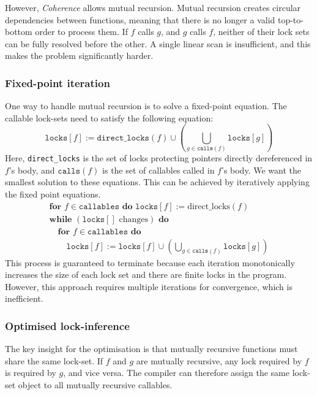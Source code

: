 However, \textit{Coherence} allows mutual recursion. Mutual recursion creates circular dependencies between functions, meaning that there is no longer a valid top-to-bottom order to process them. If $f$ calls $g$, and $g$ calls $f$, neither of their lock sets can be fully resolved before the other. A single linear scan is insufficient, and this makes the problem significantly harder.

\subsubsection{Fixed-point iteration} \label{sec:fixed-point-iter}
One way to handle mutual recursion is to solve a fixed-point equation\cite{OptComp}. The callable lock-sets need to satisfy the following equation:
$$ \texttt{locks}[f] := \texttt{direct\_locks}(f) \cup \left( \bigcup_{g \in \texttt{calls}(f)} \texttt{locks}[g] \right) $$
Here, \texttt{direct\_locks} is the set of locks protecting pointers directly dereferenced in $f$'s body, and $\texttt{calls}(f)$ is the set of callables called in $f$'s body. We want the smallest solution to these equations. This can be achieved by iteratively applying the fixed point equations.
$$
\begin{array}{l}
\textbf{for } f \in \texttt{callables} \textbf{ do } \texttt{locks}[f] := \text{direct\_locks}(f) \\
\textbf{while } (\texttt{locks}[] \text{ changes}) \textbf{ do} \\
\quad \textbf{for } f \in \texttt{callables} \textbf{ do} \\
\quad \quad \texttt{locks}[f] := \texttt{locks}[f] \cup \left( \bigcup_{g \in \texttt{calls}(f)} \texttt{locks}[g] \right)
\end{array}
$$
This process is guaranteed to terminate because each iteration monotonically increases the size of each lock set and there are finite locks in the program. However, this approach requires multiple iterations for convergence, which is inefficient.

\subsubsection{Optimised lock-inference} \label{sec:optimised-inference}
The key insight for the optimisation is that mutually recursive functions must share the same lock-set. If $f$ and $g$ are mutually recursive, any lock required by $f$ is required by $g$, and vice versa. The compiler can therefore assign the same lock-set object to all mutually recursive callables.

